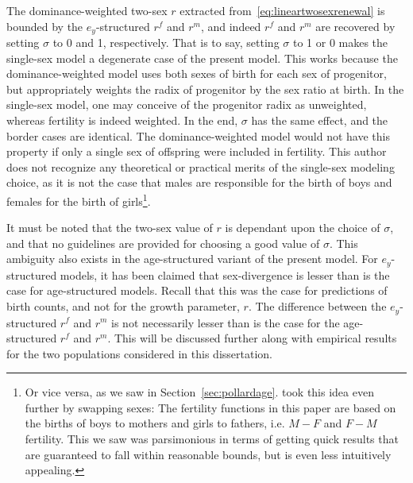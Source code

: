The dominance-weighted two-sex $r$ extracted from~\eqref{eq:lineartwosexrenewal} 
is bounded by the $e_y$-structured $r^f$ and $r^m$,
and indeed $r^f$ and $r^m$ are recovered by setting $\sigma$ to 0 and 1,
respectively. That is to say, setting $\sigma$ to 1 or 0 makes the single-sex
model a degenerate case of the present model. This works because the
dominance-weighted model uses both sexes of birth for each sex of progenitor,
but appropriately weights the radix of progenitor by the sex ratio at birth.
In the single-sex model, one may conceive of the progenitor radix as
unweighted, whereas fertility is indeed weighted. In the end, $\sigma$ has the
same effect, and the border cases are identical. The dominance-weighted model
would not have this property if only a single sex of offspring were included in
 fertility. This author does not recognize any theoretical or practical merits
 of the single-sex modeling choice, as it is not the case that males are 
 responsible for the birth of boys and females for the birth of 
 girls\footnote{Or vice versa, as we saw in
 Section~\ref{sec:pollardage}. \citet{pollard1948measurement} took this idea
 even further by swapping sexes: The fertility functions in this paper 
 are based on the births of boys to mothers and girls to 
fathers, i.e. $M-F$ and $F-M$ fertility. This we saw was parsimonious in terms 
of getting quick results that are guaranteed to fall within reasonable 
bounds, but is even less intuitively appealing.}.

It must be
noted that the two-sex value of $r$ is dependant upon the choice of $\sigma$, 
and that no guidelines are provided for choosing a good value of $\sigma$. 
This ambiguity also exists in the age-structured variant of the present model. 
For $e_y$-structured models, it has been claimed that sex-divergence is 
lesser than is the case for
age-structured models. Recall that this was the case for predictions of birth
counts, and not for the growth parameter, $r$. The
difference between the $e_y$-structured $r^f$ and $r^m$ is not necessarily 
lesser than is the case for the age-structured $r^f$ and $r^m$. This will be
discussed further along with empirical results for the two populations 
considered in this dissertation.
